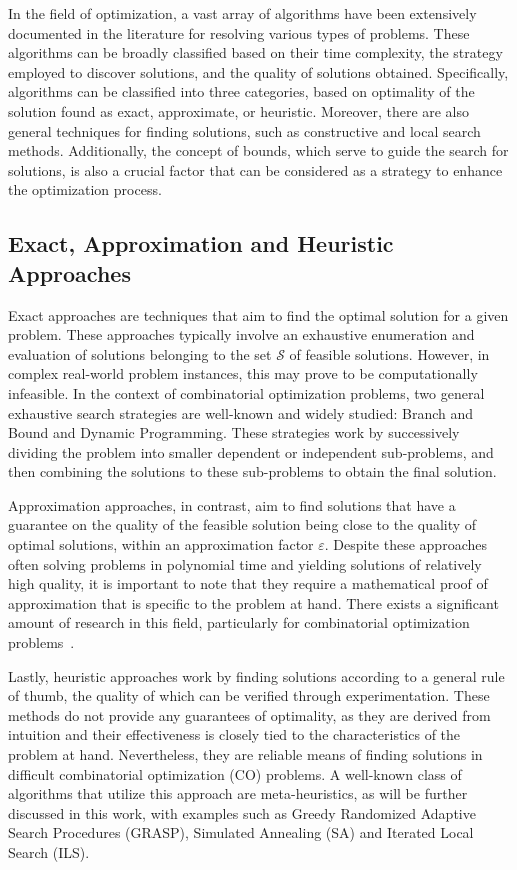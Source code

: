 In the field of optimization, a vast array of algorithms have been extensively
documented in the literature for resolving various types of problems. These
algorithms can be broadly classified based on their time complexity, the
strategy employed to discover solutions, and the quality of solutions obtained.
Specifically, algorithms can be classified into three categories, based on
optimality of the solution found as exact, approximate, or heuristic. Moreover,
there are also general techniques for finding solutions, such as constructive
and local search methods. Additionally, the concept of bounds, which serve to
guide the search for solutions, is also a crucial factor that can be considered
as a strategy to enhance the optimization process.

\subsection{Exact, Approximation and Heuristic Approaches}
\label{section:approaches}

Exact approaches are techniques that aim to find the optimal solution for a
given problem. These approaches typically involve an exhaustive enumeration and
evaluation of solutions belonging to the set $\mathcal{S}$ of feasible solutions.
However, in complex real-world problem instances, this may prove to be
computationally infeasible. In the context of combinatorial optimization
problems, two general exhaustive search strategies are well-known and widely
studied: Branch and Bound and Dynamic Programming. These strategies work by
successively dividing the problem into smaller dependent or independent
sub-problems, and then combining the solutions to these sub-problems to obtain the
final solution.

Approximation approaches, in contrast, aim to find solutions that have a
guarantee on the quality of the feasible solution being close to the quality of
optimal solutions, within an approximation factor $\varepsilon$. Despite these
approaches often solving problems in polynomial time and yielding solutions of
relatively high quality, it is important to note that they require a
mathematical proof of approximation that is specific to the problem at hand.
There exists a significant amount of research in this field, particularly for
combinatorial optimization problems~\cite{johnson1974approximation}.

Lastly, heuristic approaches work by finding solutions according to a general
rule of thumb, the quality of which can be verified through experimentation.
These methods do not provide any guarantees of optimality, as they are derived
from intuition and their effectiveness is closely tied to the characteristics of
the problem at hand. Nevertheless, they are reliable means of finding solutions
in difficult combinatorial optimization (CO) problems. A well-known class of
algorithms that utilize this approach are meta-heuristics, as will be further
discussed in this work, with examples such as Greedy Randomized Adaptive Search
Procedures (GRASP), Simulated Annealing (SA) and Iterated Local Search (ILS).

